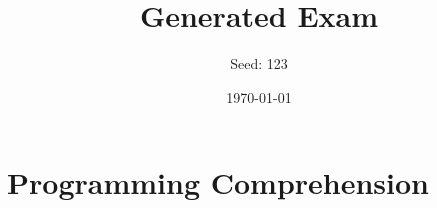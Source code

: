 \documentclass{exam}%
\title{Generated Exam}%
\author{Seed: 123}%
\date{\today}%
\begin{document}
%
\normalsize%
\maketitle%
\section{Programming Comprehension}%
\label{sec:ProgrammingComprehension}%


%
\end{document}
